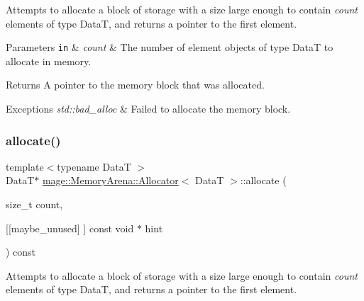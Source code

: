 Attempts to allocate a block of storage with a size large enough to contain {\itshape count} elements of type {\ttfamily DataT}, and returns a pointer to the first element.


\begin{DoxyParams}[1]{Parameters}
\mbox{\tt in}  & {\em count} & The number of element objects of type {\ttfamily DataT} to allocate in memory. \\
\hline
\end{DoxyParams}
\begin{DoxyReturn}{Returns}
A pointer to the memory block that was allocated. 
\end{DoxyReturn}

\begin{DoxyExceptions}{Exceptions}
{\em std\+::bad\+\_\+alloc} & Failed to allocate the memory block. \\
\hline
\end{DoxyExceptions}
\hypertarget{classmage_1_1_memory_arena_1_1_allocator_a699a98f902dddd5ad2b8477b8ed5f77b}{}\label{classmage_1_1_memory_arena_1_1_allocator_a699a98f902dddd5ad2b8477b8ed5f77b} 
\subsubsection{\texorpdfstring{allocate()}{allocate()}\hspace{0.1cm}{\footnotesize\ttfamily [2/2]}}
{\footnotesize\ttfamily template$<$typename DataT $>$ \\
DataT$\ast$ \hyperlink{classmage_1_1_memory_arena_1_1_allocator}{mage\+::\+Memory\+Arena\+::\+Allocator}$<$ DataT $>$\+::allocate (\begin{DoxyParamCaption}\item[{size\+\_\+t}]{count,  }\item[{\mbox{[}\mbox{[}maybe\+\_\+unused\mbox{]} \mbox{]} const void $\ast$}]{hint }\end{DoxyParamCaption}) const}

Attempts to allocate a block of storage with a size large enough to contain {\itshape count} elements of type {\ttfamily DataT}, and returns a pointer to the first element.


